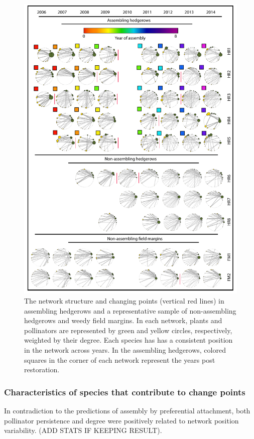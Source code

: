 \documentclass[12pt]{article}
\begin{document}
\begin{figure}
  \centering
  \includegraphics[width=.8\textwidth]{../analysis/changePoint/plotting/networks.pdf}
  \caption{The network structure and changing points (vertical red
    lines) in assembling hedgerows and a representative sample of
    non-assembling hedgerows and weedy field margins. In each network,
    plants and pollinators are represented by green and yellow
    circles, respectively, weighted by their degree. Each species has
    has a consistent position in the network across years. In the
    assembling hedgerows, colored squares in the corner of each
    network represent the years post restoration.}
  \label{fig:changePoints}
\end{figure}
\clearpage

\subsubsection*{Characteristics of species that contribute to change
  points}

In contradiction to the predictions of assembly by preferential
attachment, both pollinator persistence and degree were positively
related to network position variability. (ADD STATS IF KEEPING
RESULT).
\end{document}
